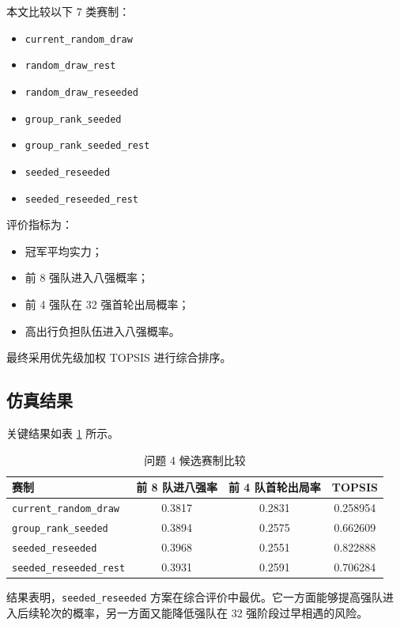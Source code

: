 \documentclass[UTF8,a4paper,12pt]{ctexart}
\begin{document}
本文比较以下 7 类赛制：

\begin{itemize}
  \item \texttt{current\_random\_draw}
  \item \texttt{random\_draw\_rest}
  \item \texttt{random\_draw\_reseeded}
  \item \texttt{group\_rank\_seeded}
  \item \texttt{group\_rank\_seeded\_rest}
  \item \texttt{seeded\_reseeded}
  \item \texttt{seeded\_reseeded\_rest}
\end{itemize}

评价指标为：

\begin{itemize}
  \item 冠军平均实力；
  \item 前 8 强队进入八强概率；
  \item 前 4 强队在 32 强首轮出局概率；
  \item 高出行负担队伍进入八强概率。
\end{itemize}

最终采用优先级加权 TOPSIS 进行综合排序。

\subsection{仿真结果}

关键结果如表 \ref{tab:problem4} 所示。

\begin{table}[H]
\centering
\caption{问题 4 候选赛制比较}
\label{tab:problem4}
\begin{tabular}{lccc}
\toprule
赛制 & 前 8 队进八强率 & 前 4 队首轮出局率 & TOPSIS \\
\midrule
\texttt{current\_random\_draw} & 0.3817 & 0.2831 & 0.258954 \\
\texttt{group\_rank\_seeded} & 0.3894 & 0.2575 & 0.662609 \\
\texttt{seeded\_reseeded} & 0.3968 & 0.2551 & 0.822888 \\
\texttt{seeded\_reseeded\_rest} & 0.3931 & 0.2591 & 0.706284 \\
\bottomrule
\end{tabular}
\end{table}

结果表明，\texttt{seeded\_reseeded} 方案在综合评价中最优。它一方面能够提高强队进入后续轮次的概率，另一方面又能降低强队在 32 强阶段过早相遇的风险。
\end{document}

